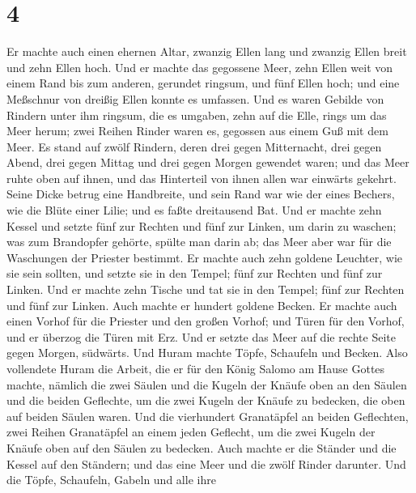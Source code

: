 \hypertarget{section-3}{%
\section{4}\label{section-3}}

 Er machte auch einen ehernen Altar, zwanzig Ellen lang
und zwanzig Ellen breit und zehn Ellen hoch.  Und er
machte das gegossene Meer, zehn Ellen weit von einem Rand bis zum
anderen, gerundet ringsum, und fünf Ellen hoch; und eine Meßschnur von
dreißig Ellen konnte es umfassen.  Und es waren Gebilde
von Rindern unter ihm ringsum, die es umgaben, zehn auf die Elle, rings
um das Meer herum; zwei Reihen Rinder waren es, gegossen aus einem Guß
mit dem Meer.  Es stand auf zwölf Rindern, deren drei
gegen Mitternacht, drei gegen Abend, drei gegen Mittag und drei gegen
Morgen gewendet waren; und das Meer ruhte oben auf ihnen, und das
Hinterteil von ihnen allen war einwärts gekehrt.  Seine
Dicke betrug eine Handbreite, und sein Rand war wie der eines Bechers,
wie die Blüte einer Lilie; und es faßte dreitausend Bat. 
Und er machte zehn Kessel und setzte fünf zur Rechten und fünf zur
Linken, um darin zu waschen; was zum Brandopfer gehörte, spülte man
darin ab; das Meer aber war für die Waschungen der Priester bestimmt.
 Er machte auch zehn goldene Leuchter, wie sie sein
sollten, und setzte sie in den Tempel; fünf zur Rechten und fünf zur
Linken.  Und er machte zehn Tische und tat sie in den
Tempel; fünf zur Rechten und fünf zur Linken. Auch machte er hundert
goldene Becken.  Er machte auch einen Vorhof für die
Priester und den großen Vorhof; und Türen für den Vorhof, und er überzog
die Türen mit Erz.  Und er setzte das Meer auf die rechte
Seite gegen Morgen, südwärts.  Und Huram machte Töpfe,
Schaufeln und Becken. Also vollendete Huram die Arbeit, die er für den
König Salomo am Hause Gottes machte,  nämlich die zwei
Säulen und die Kugeln der Knäufe oben an den Säulen und die beiden
Geflechte, um die zwei Kugeln der Knäufe zu bedecken, die oben auf
beiden Säulen waren.  Und die vierhundert Granatäpfel an
beiden Geflechten, zwei Reihen Granatäpfel an einem jeden Geflecht, um
die zwei Kugeln der Knäufe oben auf den Säulen zu bedecken.
 Auch machte er die Ständer und die Kessel auf den
Ständern;  und das eine Meer und die zwölf Rinder
darunter.  Und die Töpfe, Schaufeln, Gabeln und alle ihre
